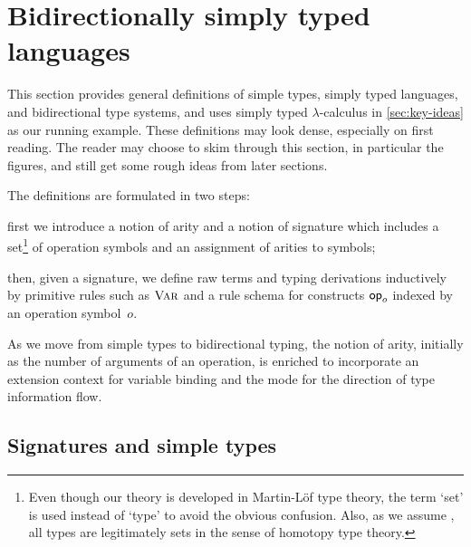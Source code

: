
\section{Bidirectionally simply typed languages}\label{sec:defs}
This section provides general definitions
of simple types, simply typed languages, and bidirectional type systems, and uses simply typed $\lambda$-calculus in \cref{sec:key-ideas} as our running example.
These definitions may look dense, especially on first reading.
The reader may choose to skim through this section, in particular the figures, and still get some rough ideas from later sections.

The definitions are formulated in two steps:
\begin{enumerate*}
  \item first we introduce a notion of arity and a notion of signature which includes a set\footnote{%
    Even though our theory is developed in Martin-L\"of type theory, the term `set' is used instead of `type' to avoid the obvious confusion. 
    Also, as we assume \AxiomK, all types are legitimately sets in the sense of homotopy type theory.
  } of operation symbols and an assignment of arities to symbols;
\item then, given a signature, we define raw terms and typing derivations inductively by primitive rules such as $\textnormal{\textsc{Var}}$ and a rule schema for constructs $\mathsf{op}_o$ indexed by an operation symbol~$o$.
\end{enumerate*}
As we move from simple types to bidirectional typing, the notion of arity, initially as the number of arguments of an operation, is enriched to incorporate an extension context for variable binding and the mode for the direction of type information flow.

\subsection{Signatures and simple types} \label{subsec:simple-types}

